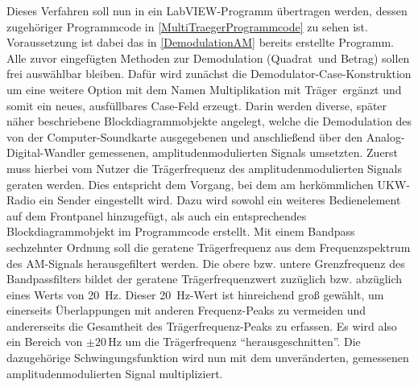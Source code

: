 \documentclass[
a4paper,
12pt,
pagesize,
ngerman
]{scrartcl}
\begin{document}
	Dieses Verfahren soll nun in ein LabVIEW-Programm übertragen werden, dessen zugehöriger Programmcode in \ref{MultiTraegerProgrammcode} zu sehen ist. 
	Voraussetzung ist dabei das in \cref{DemodulationAM} bereits erstellte Programm.
	Alle zuvor eingefügten Methoden zur Demodulation (\glqq Quadrat\grqq\ und \glqq Betrag\grqq ) sollen frei auswählbar bleiben.
	Dafür wird zunächst die Demodulator-Case-Konstruktion um eine weitere Option mit dem Namen \glqq Multiplikation mit Träger\grqq\ ergänzt und somit ein neues, ausfüllbares Case-Feld erzeugt.
	Darin werden diverse, später näher beschriebene Blockdiagrammobjekte angelegt, welche die Demodulation des von der Computer-Soundkarte ausgegebenen und anschließend über den Analog-Digital-Wandler gemessenen, amplitudenmodulierten Signals umsetzten.
	Zuerst muss hierbei vom Nutzer die Trägerfrequenz des amplitudenmodulierten Signals geraten werden.
	Dies entspricht dem Vorgang, bei dem am herkömmlichen UKW-Radio ein Sender eingestellt wird.
	Dazu wird sowohl ein weiteres Bedienelement auf dem Frontpanel hinzugefügt, als auch ein entsprechendes Blockdiagrammobjekt im Programmcode erstellt.
	Mit einem Bandpass sechzehnter Ordnung soll die geratene Trägerfrequenz aus dem Frequenzspektrum des AM-Signals herausgefiltert werden. 
	Die obere bzw. untere Grenzfrequenz des Bandpassfilters bildet der geratene Trägerfrequenzwert zuzüglich bzw. abzüglich eines Werts von \SI{20}{\hertz}. 
	Dieser \SI{20}{\hertz}-Wert ist hinreichend groß gewählt, um einerseits Überlappungen mit anderen Frequenz-Peaks zu vermeiden und andererseits die Gesamtheit des Trägerfrequenz-Peaks zu erfassen. 
	Es wird also ein Bereich von $\pm 20\,$Hz um die Trägerfrequenz \enquote{herausgeschnitten}. 
	Die dazugehörige Schwingungsfunktion wird nun mit dem unveränderten, gemessenen amplitudenmodulierten Signal multipliziert. 
	
\end{document}
